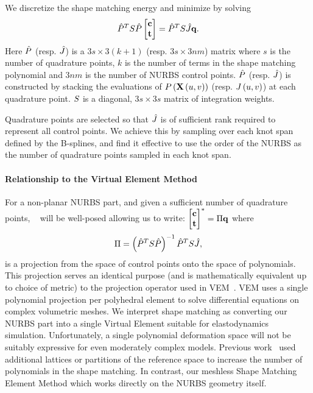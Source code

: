 We discretize the shape matching energy and minimize by solving
\begin{equation}
\hat{P}^TS\hat{P}\begin{bmatrix} \mathbf{c}\\ \mathbf{t} \end{bmatrix} = \hat{P}^TS\hat{J}\mathbf{q}.
\label{eq:shapematch}
\end{equation} Here $\hat{P}$ (resp. $\hat{J}$) is a $3s \times 3(k+1)$ (resp. $3s \times 3nm$) matrix where $s$ is the number of quadrature points, 
$k$ is the number of  terms in the shape matching polynomial and $3nm$ is the number of NURBS control points. 
$\hat{P}$ (resp. $\hat{J}$) is constructed by stacking the evaluations of $P\left(\mathbf{X}\left(u,v\right)\right)$ (resp. $J\left(u, v\right)$) at each
quadrature point.
$S$ is a diagonal, $3s \times 3s$ matrix of integration weights.

Quadrature points are selected so that $\hat{J}$ is of sufficient rank required to represent all control points. We achieve this by sampling over each knot span defined by the  B-splines, and find it effective to use the order of the NURBS as the number of quadrature points sampled in each knot span.


\paragraph*{Relationship to the Virtual Element Method}
For a non-planar NURBS part, and given a sufficient number of quadrature points, ~ will be well-posed allowing us to write: $\begin{bmatrix} \mathbf{c}\\ \mathbf{t} \end{bmatrix}^* = \Pi\mathbf{q}$ where
\begin{equation*}
    \Pi = \left(\hat{P}^TS\hat{P}\right)^{-1}\hat{P}^TS\hat{J},
\end{equation*} is a projection from the space of control points onto the space of polynomials. 
This projection serves an identical purpose (and is mathematically equivalent up to choice of metric) to the projection operator used in VEM~\cite{10.1142/S021820251440003X}.
VEM uses a single polynomial projection per polyhedral element to solve differential equations on complex volumetric meshes.
We interpret shape matching as converting our NURBS part into a single Virtual Element suitable for elastodynamics simulation.
Unfortunately, a single polynomial deformation space will not be suitably expressive for even moderately complex models.
Previous work~\cite{10.1145/1073204.1073216,10.1145/1275808.1276480} used additional lattices or partitions of the reference space to 
increase the number of polynomials in the shape matching. In contrast, our meshless Shape Matching Element Method which works directly on the NURBS
geometry itself.

